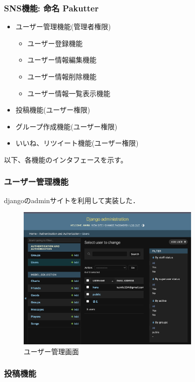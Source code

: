 \documentclass[a4j]{jarticle}
\begin{document}
\subsubsection*{SNS機能: 命名 Pakutter}
\begin{itemize}
  \item ユーザー管理機能(管理者権限)
  \begin{itemize}
    \item ユーザー登録機能
    \item ユーザー情報編集機能
    \item ユーザー情報削除機能
    \item ユーザー情報一覧表示機能
  \end{itemize}
  \item 投稿機能(ユーザー権限)
  \item グループ作成機能(ユーザー権限)
  \item いいね、リツイート機能(ユーザー権限)
\end{itemize}
以下、各機能のインタフェースを示す。
\subsubsection{ユーザー管理機能}
djangoのadminサイトを利用して実装した．

\begin{figure}[htbp]
  \centering
  \includegraphics[width=0.8\textwidth,bb=0 0 800 600]{img/admin.jpg}
  \caption{ユーザー管理画面}
\end{figure}

\subsubsection{投稿機能}
\end{document}

